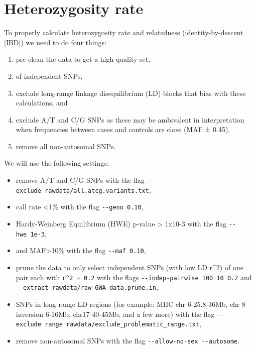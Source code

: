 \documentclass[
]{book}
\providecommand{\tightlist}{%
  \setlength{\itemsep}{0pt}\setlength{\parskip}{0pt}}
\begin{document}
\hypertarget{heterozygosity-rate}{%
\section{Heterozygosity rate}\label{heterozygosity-rate}}

To properly calculate heterozygosity rate and relatedness (identity-by-descent {[}IBD{]}) we need to do four things:

\begin{enumerate}
\def\labelenumi{\arabic{enumi})}
\tightlist
\item
  pre-clean the data to get a high-quality set,
\item
  of independent SNPs,
\item
  exclude long-range linkage disequilibrium (LD) blocks that bias with these calculations, and
\item
  exclude A/T and C/G SNPs as these may be ambivalent in interpretation when frequencies between cases and controls are close (MAF ± 0.45),
\item
  remove all non-autosomal SNPs.
\end{enumerate}

We will use the following settings:

\begin{itemize}
\tightlist
\item
  remove A/T and C/G SNPs with the flag \texttt{-\/-exclude\ rawdata/all.atcg.variants.txt},
\item
  call rate \textless1\% with the flag \texttt{-\/-geno\ 0.10},
\item
  Hardy-Weinberg Equilibrium (HWE) p-value \textgreater{} 1x10-3 with the flag \texttt{-\/-hwe\ 1e-3},
\item
  and MAF\textgreater10\% with the flag \texttt{-\/-maf\ 0.10},
\item
  prune the data to only select independent SNPs (with low LD r\^{}2) of one pair each with \texttt{r\^{}2\ =\ 0.2} with the flags \texttt{-\/-indep-pairwise\ 100\ 10\ 0.2} and \texttt{-\/-extract\ rawdata/raw-GWA-data.prune.in},
\item
  SNPs in long-range LD regions (for example: MHC chr 6 25.8-36Mb, chr 8 inversion 6-16Mb, chr17 40-45Mb, and a few more) with the flag \texttt{-\/-exclude\ range\ rawdata/exclude\_problematic\_range.txt},
\item
  remove non-autosomal SNPs with the flag \texttt{-\/-allow-no-sex\ -\/-autosome}.
\end{itemize}
\end{document}
